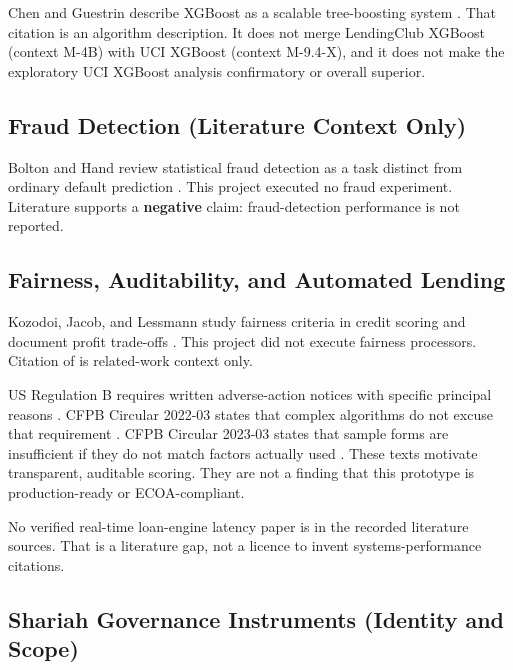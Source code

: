 \documentclass{ieeeaccess}
\begin{document}
Chen and Guestrin describe XGBoost as a scalable tree-boosting system \cite{b18}. That citation is an algorithm description. It does not merge LendingClub XGBoost (context M-4B) with UCI XGBoost (context M-9.4-X), and it does not make the exploratory UCI XGBoost analysis confirmatory or overall superior.

\subsection{Fraud Detection (Literature Context Only)}

Bolton and Hand review statistical fraud detection as a task distinct from ordinary default prediction \cite{b19}. This project executed no fraud experiment. Literature \cite{b19} supports a \textbf{negative} claim: fraud-detection performance is not reported.

\subsection{Fairness, Auditability, and Automated Lending}

Kozodoi, Jacob, and Lessmann study fairness criteria in credit scoring and document profit trade-offs \cite{b8}. This project did not execute fairness processors. Citation of \cite{b8} is related-work context only.

US Regulation B requires written adverse-action notices with specific principal reasons \cite{b32}. CFPB Circular 2022-03 states that complex algorithms do not excuse that requirement \cite{b33}. CFPB Circular 2023-03 states that sample forms are insufficient if they do not match factors actually used \cite{b34}. These texts motivate transparent, auditable scoring. They are not a finding that this prototype is production-ready or ECOA-compliant.

No verified real-time loan-engine latency paper is in the recorded literature sources. That is a literature gap, not a licence to invent systems-performance citations.

\subsection{Shariah Governance Instruments (Identity and Scope)}
\end{document}
